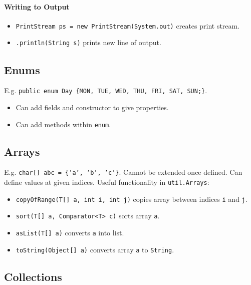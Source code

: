 \documentclass[twocolumn,english]{article}
\begin{document}
\paragraph{Writing to Output}
\begin{itemize}
\item \texttt{PrintStream ps = new PrintStream(System.out)} creates print
stream.
\item \texttt{.println(String s)} prints new line of output.
\end{itemize}

\subsection{Enums}

E.g. \texttt{public enum Day \{MON, TUE, WED, THU, FRI, SAT, SUN;\}}.
\begin{itemize}
\item Can add fields and constructor to give properties.
\item Can add methods within \texttt{enum}.
\end{itemize}

\subsection{Arrays}

E.g. \texttt{char{[}{]} abc = \{'a', 'b', 'c'\}}. Cannot be extended
once defined. Can define values at given indices. Useful functionality
in \texttt{util.Arrays}:
\begin{itemize}
\item \texttt{copyOfRange(T{[}{]} a, int i, int j)} copies array between
indices \texttt{i} and \texttt{j}.
\item \texttt{sort(T{[}{]} a, Comparator\textless{}T\textgreater{} c)} sorts
array \texttt{a}.
\item \texttt{asList(T{[}{]} a)} converts \texttt{a} into list.
\item \texttt{toString(Object{[}{]} a)} converts array \texttt{a} to \texttt{String}.
\end{itemize}

\subsection{Collections}
\end{document}
